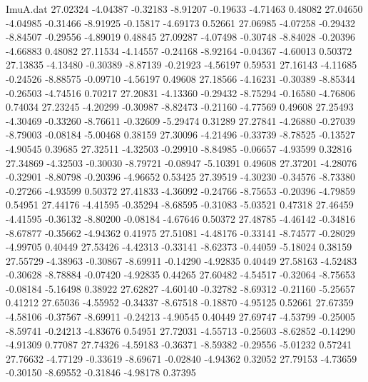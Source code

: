 \begin{filecontents}{ImuA.dat}
  27.02324   -4.04387   -0.32183   -8.91207   -0.19633   -4.71463    0.48082
  27.04650   -4.04985   -0.31466   -8.91925   -0.15817   -4.69173    0.52661
  27.06985   -4.07258   -0.29432   -8.84507   -0.29556   -4.89019    0.48845
  27.09287   -4.07498   -0.30748   -8.84028   -0.20396   -4.66883    0.48082
  27.11534   -4.14557   -0.24168   -8.92164   -0.04367   -4.60013    0.50372
  27.13835   -4.13480   -0.30389   -8.87139   -0.21923   -4.56197    0.59531
  27.16143   -4.11685   -0.24526   -8.88575   -0.09710   -4.56197    0.49608
  27.18566   -4.16231   -0.30389   -8.85344   -0.26503   -4.74516    0.70217
  27.20831   -4.13360   -0.29432   -8.75294   -0.16580   -4.76806    0.74034
  27.23245   -4.20299   -0.30987   -8.82473   -0.21160   -4.77569    0.49608
  27.25493   -4.30469   -0.33260   -8.76611   -0.32609   -5.29474    0.31289
  27.27841   -4.26880   -0.27039   -8.79003   -0.08184   -5.00468    0.38159
  27.30096   -4.21496   -0.33739   -8.78525   -0.13527   -4.90545    0.39685
  27.32511   -4.32503   -0.29910   -8.84985   -0.06657   -4.93599    0.32816
  27.34869   -4.32503   -0.30030   -8.79721   -0.08947   -5.10391    0.49608
  27.37201   -4.28076   -0.32901   -8.80798   -0.20396   -4.96652    0.53425
  27.39519   -4.30230   -0.34576   -8.73380   -0.27266   -4.93599    0.50372
  27.41833   -4.36092   -0.24766   -8.75653   -0.20396   -4.79859    0.54951
  27.44176   -4.41595   -0.35294   -8.68595   -0.31083   -5.03521    0.47318
  27.46459   -4.41595   -0.36132   -8.80200   -0.08184   -4.67646    0.50372
  27.48785   -4.46142   -0.34816   -8.67877   -0.35662   -4.94362    0.41975
  27.51081   -4.48176   -0.33141   -8.74577   -0.28029   -4.99705    0.40449
  27.53426   -4.42313   -0.33141   -8.62373   -0.44059   -5.18024    0.38159
  27.55729   -4.38963   -0.30867   -8.69911   -0.14290   -4.92835    0.40449
  27.58163   -4.52483   -0.30628   -8.78884   -0.07420   -4.92835    0.44265
  27.60482   -4.54517   -0.32064   -8.75653   -0.08184   -5.16498    0.38922
  27.62827   -4.60140   -0.32782   -8.69312   -0.21160   -5.25657    0.41212
  27.65036   -4.55952   -0.34337   -8.67518   -0.18870   -4.95125    0.52661
  27.67359   -4.58106   -0.37567   -8.69911   -0.24213   -4.90545    0.40449
  27.69747   -4.53799   -0.25005   -8.59741   -0.24213   -4.83676    0.54951
  27.72031   -4.55713   -0.25603   -8.62852   -0.14290   -4.91309    0.77087
  27.74326   -4.59183   -0.36371   -8.59382   -0.29556   -5.01232    0.57241
  27.76632   -4.77129   -0.33619   -8.69671   -0.02840   -4.94362    0.32052
  27.79153   -4.73659   -0.30150   -8.69552   -0.31846   -4.98178    0.37395

\end{filecontents}
